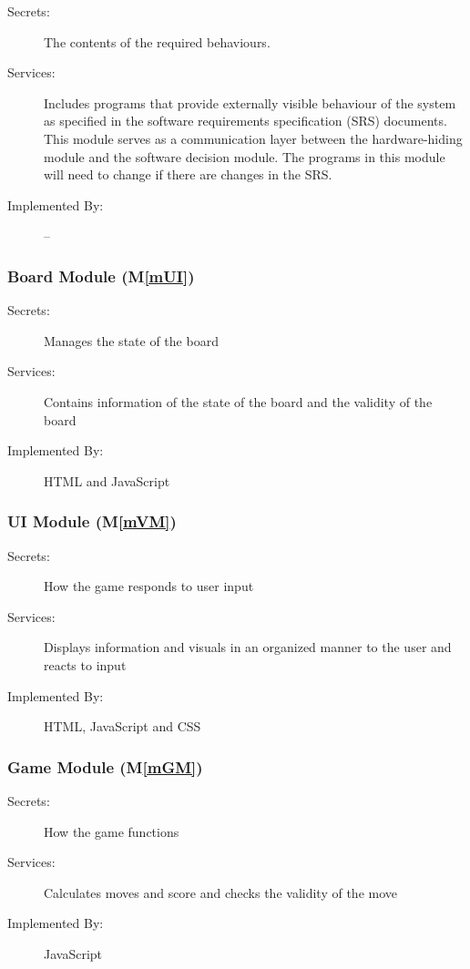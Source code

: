 \documentclass[12pt, titlepage]{article}
\newcommand{\mref}[1]{M\ref{#1}}
\begin{document}
{\begin{description}
\item[Secrets:]The contents of the required behaviours.
\item[Services:]Includes programs that provide externally visible behaviour of
  the system as specified in the software requirements specification (SRS)
  documents. This module serves as a communication layer between the
  hardware-hiding module and the software decision module. The programs in this
  module will need to change if there are changes in the SRS.
\item[Implemented By:] --
\end{description}

\subsubsection{{\color{blue}Board Module }  (\mref{mUI})}

\begin{description}
\item[Secrets:]{\color{blue}Manages the state of the board } 
\item[Services:]Contains information of the state of the board and the validity of the board
\item[Implemented By:] HTML and JavaScript
\end{description}

\subsubsection{{\color{blue}UI Module } (\mref{mVM})}

\begin{description}
\item[Secrets:]{\color{blue}How the game responds to user input}
\item[Services:]Displays information and visuals in an organized manner to the user and reacts to input
\item[Implemented By:] HTML, JavaScript and CSS
\end{description}

\subsubsection{Game Module  (\mref{mGM})}

\begin{description}
\item[Secrets:]{\color{blue}How the game functions}
\item[Services:]Calculates moves and score and checks the validity of the move
\item[Implemented By:] JavaScript
\end{description}

}
\end{document}
